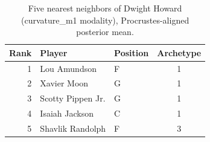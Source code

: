 \begin{table}[htbp]
  \centering\small
  \begin{tabular}{rllc}
    \toprule
    Rank & Player & Position & Archetype \\
    \midrule
    1 & Lou Amundson & F & 1 \\
    2 & Xavier Moon & G & 1 \\
    3 & Scotty Pippen Jr. & G & 1 \\
    4 & Isaiah Jackson & C & 1 \\
    5 & Shavlik Randolph & F & 3 \\
    \bottomrule
  \end{tabular}
  \caption{Five nearest neighbors of Dwight Howard (curvature_m1 modality), Procrustes-aligned posterior mean.}
  \label{tab:Dwight_Howard_neighbors_curvature_m1}
\end{table}

